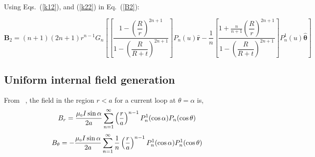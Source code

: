 Using Eqs.~(\ref{k12}), and (\ref{k22}) in Eq.~(\ref{B2}):




$$\bm B_2= (n+1)(2n+1)r^{n-1}G_n\left[\left[\frac{1-\left(\dfrac{R}{r}\right)^{2n+1}}{1-\left(\dfrac{R}{R+t}\right)^{2n+1}}\right] P_n(u) \bm{\hat{r}} -\frac{1}{n}\left[\frac{1+\frac{n}{n+1}\left(\dfrac{R}{r}\right)^{2n+1}}{1-\left(\dfrac{R}{R+t}\right)^{2n+1}}\right] P_n^1(u) \bm{\hat{\theta}}\right]$$


\subsection{Uniform internal field generation}
From ~\cite{ smythe}, the field in the region $r< a$ for a current loop at \(\theta=\alpha\) is,
\begin{equation}\label{bbr}
B_r=\frac{\mu_{\scriptscriptstyle 0} I \sin \alpha}{2a}\sum_{n=1}^{\infty} \left(\frac{r}{a}\right)^{n-1}P_n^1(\cos\alpha) P_n(\cos\theta)
\end{equation}
\begin{equation}\label{bbt}
B_\theta=-\frac{\mu_{\scriptscriptstyle 0} I \sin \alpha}{2a}\sum_{n=1}^{\infty} \frac{1}{n}\left(\frac{r}{a}\right)^{n-1}P_n^1(\cos\alpha) P_n^1(\cos\theta)
\end{equation}

